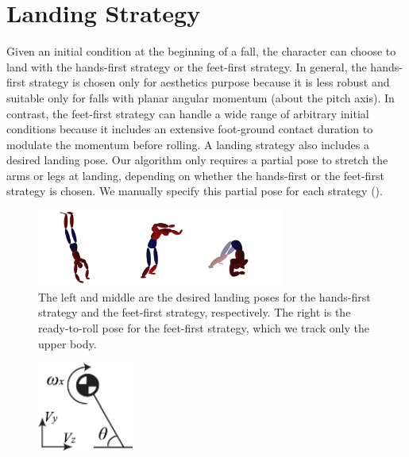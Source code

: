 \section{Landing Strategy}

Given an initial condition at the beginning of a fall, the character
can choose to land with the hands-first strategy or the feet-first
strategy.  In general, the hands-first strategy is chosen only for
aesthetics purpose because it is less robust and suitable only for
falls with planar angular momentum (about the pitch axis). In
contrast, the feet-first strategy can handle a wide range of arbitrary
initial conditions because it includes an extensive foot-ground
contact duration to modulate the momentum before rolling. A
landing strategy also includes a desired landing pose. Our algorithm
only requires a partial pose to stretch the arms or legs at landing,
depending on whether the hands-first or the feet-first strategy is
chosen. We manually specify this partial pose for each strategy
().


\begin{figure}[ht]
\center
  \includegraphics[width=3.2in]{images/LandingPoses}
  \caption{
    The left and middle are the desired landing poses for the
    hands-first strategy and the feet-first strategy, respectively.
    The right is the ready-to-roll pose for the feet-first strategy,
    which we track only the upper body.
  }
 \label{fig:landing_landingPoses}
\end{figure}

\begin{figure}
  \begin{center}
    \includegraphics[width=0.28\textwidth]{images/COM}
  \end{center}
  \caption{}
  \label{fig:landing_com}
\end{figure}


